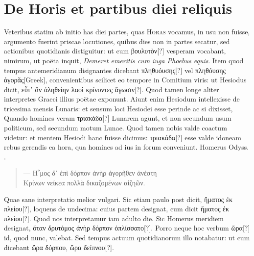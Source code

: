 \section{De Horis et partibus diei reliquis}
Veteribus statim ab initio has diei partes, quas \textsc{Horas}
vocamus, in usu non fuisse, argumento fuerint priscae locutiones,
quibus dies non in partes secatur, sed actionibus quotidianis
distiguitur: ut cum \textgreek{βουλυτὸν[?]} vesperam vocabant, 
nimirum, ut poëta
inquit, \textit{Demeret emeritis cum iuga Phoebus equis}.
Item quod tempus
antemeridianum disignantes dicebant \textgreek{πληθυόυσης[?]}
 vel \textgreek{πληθόυσης ἀγορᾶς[Greek]},
convenientibus scilicet eo tempore in Comitium viris: ut Hesiodus dicit,
\textgreek{εὖτ᾽ ἂν ἀληθείην λαοὶ κρίνοντες ἄγωσιν[?]}.
Quod tamen longe aliter interpretes
Graeci illius poëtae exponunt.
Aiunt enim Hesiodum intellexisse
de tricesima mensis Lunaris: et sensum loci Hesiodei esse perinde
ac si dixisset, Quando homines veram \textgreek{τριακάδα[?]} Lunarem agunt, et
non secundum usum politicum, sed secundum motum Lunae.
Quod
tamen nobis valde coactum videtur: et mentem Hesiodi hanc fuisse dicimus:
\textgreek{τριακάδα[?]} esse valde idoneam rebus gerendis ea hora,
 qua homines
ad ius in forum conveniunt.
Homerus Odyss. \textgreek{}. %
\begin{verse}
\textgreek{— Η῏μος δ᾽ ἐπὶ δόρπον ἀνὴρ ἀγορῆθεν ἀνέστη}\\
\textgreek{Κρίνων νείκεα πολλὰ δικαζομένων αἰζηῶν}.
\end{verse}
%
Quae sane interpretatio melior vulgari.
Sic etiam paulo post dicit,
\textgreek{ἤματος ἐκ πλείου[?]}, loquens de undecima: cuius partem designat,
 cum dicit
\textgreek{ἤματος ἐκ πλείου[?]}.
Quod nos interpretamur iam adulto die.
Sic Homerus
meridiem designat, \textgreek{ὅταν δρυτόμος ἀνὴρ δόρπον ὁπλίσσατο[?]}.
Porro neque
hoc verbum \textgreek{ὥρα[?]} id, quod nunc, valebat.
Sed tempus actuum quotidianorum
illo notabatur: ut cum dicebant \textgreek{ὥρα δόρπου, ὥρα δείπνου[?]}.
